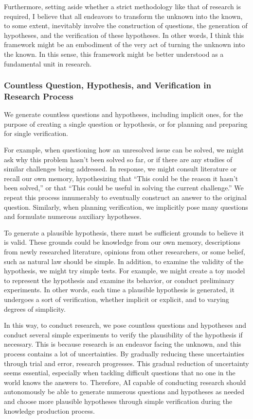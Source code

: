 Furthermore, setting aside whether a strict methodology like that of research is required, I believe that all endeavors to transform the unknown into the known, to some extent, inevitably involve the construction of questions, the generation of hypotheses, and the verification of these hypotheses. In other words, I think this framework might be an embodiment of the very act of turning the unknown into the known. In this sense, this framework might be better understood as a fundamental unit in research.

\subsubsection{Countless Question, Hypothesis, and Verification in Research Process}
We generate countless questions and hypotheses, including implicit ones, for the purpose of creating a single question or hypothesis, or for planning and preparing for single verification.

For example, when questioning how an unresolved issue can be solved, we might ask why this problem hasn't been solved so far, or if there are any studies of similar challenges being addressed. In response, we might consult literature or recall our own memory, hypothesizing that ``This could be the reason it hasn't been solved,'' or that ``This could be useful in solving the current challenge.'' We repeat this process innumerably to eventually construct an answer to the original question. Similarly, when planning verification, we implicitly pose many questions and formulate numerous auxiliary hypotheses.

To generate a plausible hypothesis, there must be sufficient grounds to believe it is valid. These grounds could be knowledge from our own memory, descriptions from newly researched literature, opinions from other researchers, or some belief, such as natural law should be simple. In addition, to examine the validity of the hypothesis, we might try simple tests. For example, we might create a toy model to represent the hypothesis and examine its behavior, or conduct preliminary experiments. In other words, each time a plausible hypothesis is generated, it undergoes a sort of verification, whether implicit or explicit, and to varying degrees of simplicity.

In this way, to conduct research, we pose countless questions and hypotheses and conduct several simple  experiments to verify the plausibility of the hypothesis if necessary. This is because research is an endeavor facing the unknown, and this process contains a lot of uncertainties. By gradually reducing these uncertainties through trial and error, research progresses. This gradual reduction of uncertainty seems essential, especially when tackling difficult questions that no one in the world knows the answers to. Therefore, AI capable of conducting research should autonomously be able to generate numerous questions and hypotheses as needed and choose more plausible hypotheses through simple verification during the knowledge production process.

